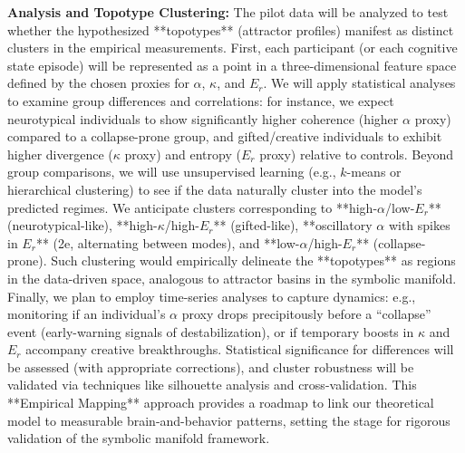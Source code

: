 \noindent\textbf{Analysis and Topotype Clustering:} The pilot data will be analyzed to test whether the hypothesized **topotypes** (attractor profiles) manifest as distinct clusters in the empirical measurements. First, each participant (or each cognitive state episode) will be represented as a point in a three-dimensional feature space defined by the chosen proxies for $\alpha$, $\kappa$, and $E_r$. We will apply statistical analyses to examine group differences and correlations: for instance, we expect neurotypical individuals to show significantly higher coherence (higher $\alpha$ proxy) compared to a collapse-prone group, and gifted/creative individuals to exhibit higher divergence ($\kappa$ proxy) and entropy ($E_r$ proxy) relative to controls. Beyond group comparisons, we will use unsupervised learning (e.g., $k$-means or hierarchical clustering) to see if the data naturally cluster into the model’s predicted regimes. We anticipate clusters corresponding to **high-$\alpha$/low-$E_r$** (neurotypical-like), **high-$\kappa$/high-$E_r$** (gifted-like), **oscillatory $\alpha$ with spikes in $E_r$** (2e, alternating between modes), and **low-$\alpha$/high-$E_r$** (collapse-prone). Such clustering would empirically delineate the **topotypes** as regions in the data-driven space, analogous to attractor basins in the symbolic manifold. Finally, we plan to employ time-series analyses to capture dynamics: e.g., monitoring if an individual’s $\alpha$ proxy drops precipitously before a “collapse” event (early-warning signals of destabilization), or if temporary boosts in $\kappa$ and $E_r$ accompany creative breakthroughs. Statistical significance for differences will be assessed (with appropriate corrections), and cluster robustness will be validated via techniques like silhouette analysis and cross-validation. This **Empirical Mapping** approach provides a roadmap to link our theoretical model to measurable brain-and-behavior patterns, setting the stage for rigorous validation of the symbolic manifold framework.

